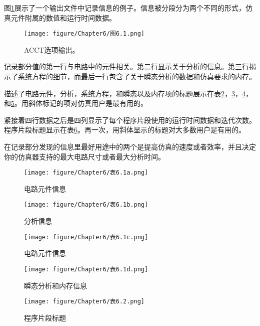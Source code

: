 图\ref{图6.1}展示了一个输出文件中记录信息的例子。信息被分段分为两个不同的形式，仿真元件附属的数值和运行时间数据。

\begin{figure}[htbp]
\small
    \centering
    \texttt{[image: figure/Chapter6/图6.1.png]}
    \caption{ACCT选项输出。}
    \label{图6.1}
\end{figure}

记录部分值的第一行与电路中的元件相关。第二行显示关于分析的信息。第三行揭示了系统方程的细节，而最后一行包含了关于瞬态分析的数据和仿真要求的内存。

描述了电路元件，分析，系统方程，和瞬态以及内存项的标题展示在表\ref{表6.1a}，\ref{表6.1b}，\ref{表6.1c}，和\ref{表6.1d}。用斜体标记的项对仿真用户是最有用的。

紧接着四行数据之后是四列显示了每个程序片段使用的运行时间数据和迭代次数。程序片段标题显示在表\ref{表6.2}。再一次，用斜体显示的标题对大多数用户是有用的。

在记录部分发现的信息里最好用途中的两个是提高仿真的速度或者效率，并且决定你的仿真器支持的最大电路尺寸或者最大分析时间。

\begin{figure}[htbp]
\small
    \centering
    \texttt{[image: figure/Chapter6/表6.1a.png]}
    \caption{电路元件信息}
    \label{表6.1a}
\end{figure}

\begin{figure}[htbp]
\small
    \centering
    \texttt{[image: figure/Chapter6/表6.1b.png]}
    \caption{分析信息}
    \label{表6.1b}
\end{figure}

\begin{figure}[htbp]
\small
    \centering
    \texttt{[image: figure/Chapter6/表6.1c.png]}
    \caption{电路元件信息}
    \label{表6.1c}
\end{figure}

\begin{figure}[htbp]
\small
    \centering
    \texttt{[image: figure/Chapter6/表6.1d.png]}
    \caption{瞬态分析和内存信息}
    \label{表6.1d}
\end{figure}

\begin{figure}[htbp]
\small
    \centering
    \texttt{[image: figure/Chapter6/表6.2.png]}
    \caption{程序片段标题}
    \label{表6.2}
\end{figure}

